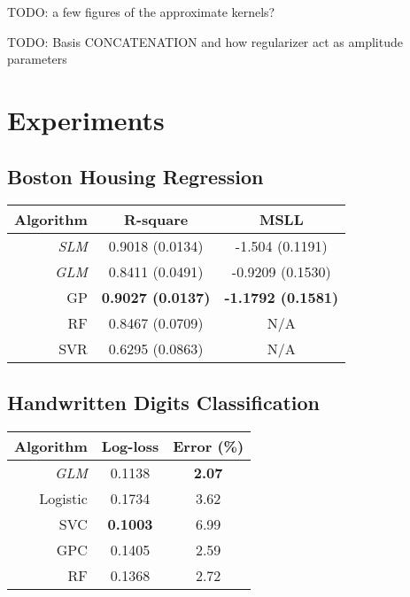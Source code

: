 \documentclass[11pt, oneside]{article}
\begin{document}
TODO: a few figures of the approximate kernels?

TODO: Basis CONCATENATION and how regularizer act as amplitude parameters

\section{Experiments}

\subsection{Boston Housing Regression}

\begin{table}[htb]

    \centering
    \begin{tabular}{r|c c}
        \textbf{Algorithm} & \textbf{R-square} & \textbf{MSLL} \\
        \hline
        \emph{SLM} & 0.9018 (0.0134) & -1.504 (0.1191) \\
        \emph{GLM} & 0.8411 (0.0491) & -0.9209 (0.1530) \\
        GP & \textbf{0.9027 (0.0137)} & \textbf{-1.1792 (0.1581)} \\
        RF & 0.8467 (0.0709) & N/A \\ 
        SVR & 0.6295 (0.0863) & N/A \\
        \hline
    \end{tabular}

\end{table}

\subsection{Handwritten Digits Classification}

\begin{table}[htb]

    \centering
    \begin{tabular}{r|c c}
        \textbf{Algorithm} & \textbf{Log-loss} & \textbf{Error (\%)} \\
        \hline
        \emph{GLM} & 0.1138 & \textbf{2.07} \\
        Logistic & 0.1734 & 3.62 \\
        SVC & \textbf{0.1003} & 6.99 \\
        GPC &  0.1405 & 2.59 \\
        RF & 0.1368 & 2.72 \\
        \hline
    \end{tabular}

\end{table}
\end{document}
